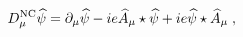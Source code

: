 \begin{equation}
D^{\mbox{\scriptsize NC}}_\mu \widehat \psi = \partial_\mu \widehat \psi - i e \widehat A_\mu \star \widehat \psi
+ i e \widehat\psi \star \widehat A_\mu \;,
\label{ncc}
\end{equation}

